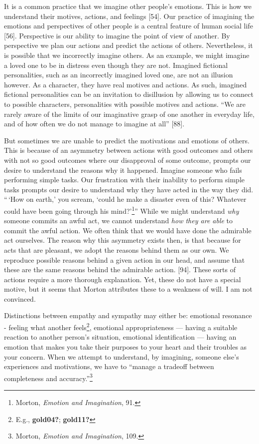 \documentclass[
  12pt,
]{book}
\theoremstyle{definition}
\theoremstyle{definition}
\theoremstyle{definition}
\theoremstyle{definition}
\theoremstyle{remark}
\begin{document}
It is a common practice that we imagine other people's emotions. This is how we understand their motives, actions, and feelings {[}54{]}. Our practice of imagining the emotions and perspectives of other people is a central feature of human social life {[}56{]}. Perspective is our ability to imagine the point of view of another. By perspective we plan our actions and predict the actions of others. Nevertheless, it is possible that we incorrectly imagine others. As an example, we might imagine a loved one to be in distress even though they are not. Imagined fictional personalities, such as an incorrectly imagined loved one, are not an illusion however. As a character, they have real motives and actions. As such, imagined fictional personalities can be an invitation to disillusion by allowing us to connect to possible characters, personalities with possible motives and actions. ``We are rarely aware of the limits of our imaginative grasp of one another in everyday life, and of how often we do not manage to imagine at all'' {[}88{]}.

But sometimes we are unable to predict the motivations and emotions of others. This is because of an asymmetry between actions with good outcomes and others
with not so good outcomes where our disapproval of some outcome, prompts our desire to understand the reasons why it happened. Imagine someone who fails performing simple tasks. Our frustration with their inability to perform simple tasks prompts our desire to understand why they have acted in the way they did. ``\,`How on earth,' you scream, `could he make a disaster even of this? Whatever could have been going through his mind?'\footnote{Morton, \emph{Emotion and {Imagination}}, 91.}'' While we might understand \emph{why} someone commits an awful act, we cannot understand \emph{how they are able} to commit the awful action. We often think that we would have done the admirable act ourselves. The reason why this asymmetry exists then, is that because for acts that are pleasant, we adopt the reasons behind them as our own. We reproduce possible reasons behind a given action in our head, and assume that these are the same reasons behind the admirable action.
{[}94{]}. These sorts of actions require a more thorough explanation. Yet, these do not have a special motive, but it seems that Morton attributes these to a weakness of will. I am not convinced.

Distinctions between empathy and sympathy may either be: emotional resonance - feeling what another feels\footnote{E.g., \textbf{gold04?}; \textbf{gold11?}}, emotional appropriateness --- having a suitable reaction to another person's situation, emotional identification --- having an emotion that makes you take their purposes to your heart
and their troubles as your concern. When we attempt to understand, by imagining, someone else's experiences and motivations, we have to
``manage a tradeoff between completeness and accuracy.''\footnote{Morton, \emph{Emotion and {Imagination}}, 109.}
\end{document}

